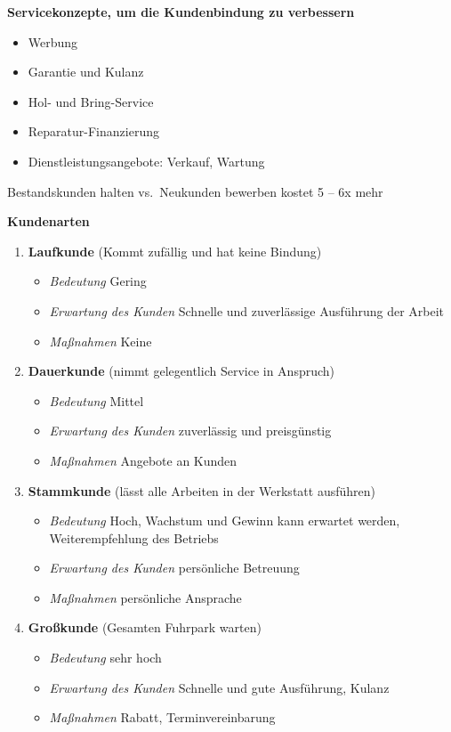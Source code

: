\textbf{Servicekonzepte, um die Kundenbindung zu verbessern}

\begin{itemize}
\item
  Werbung
\item
  Garantie und Kulanz
\item
  Hol- und Bring-Service
\item
  Reparatur-Finanzierung
\item
  Dienstleistungsangebote: Verkauf, Wartung
\end{itemize}

Bestandskunden halten vs.~Neukunden bewerben kostet 5 -- 6x mehr

\newpage

\textbf{Kundenarten}

\begin{enumerate}
\item
  \textbf{Laufkunde} (Kommt zufällig und hat keine Bindung)

  \begin{itemize}
  \item
    \emph{Bedeutung} Gering
  \item
    \emph{Erwartung des Kunden} Schnelle und zuverlässige Ausführung der
    Arbeit
  \item
    \emph{Maßnahmen} Keine
  \end{itemize}
\item
  \textbf{Dauerkunde} (nimmt gelegentlich Service in Anspruch)

  \begin{itemize}
  \item
    \emph{Bedeutung} Mittel
  \item
    \emph{Erwartung des Kunden} zuverlässig und preisgünstig
  \item
    \emph{Maßnahmen} Angebote an Kunden
  \end{itemize}
\item
  \textbf{Stammkunde} (lässt alle Arbeiten in der Werkstatt ausführen)

  \begin{itemize}
  \item
    \emph{Bedeutung} Hoch, Wachstum und Gewinn kann erwartet werden,
    Weiterempfehlung des Betriebs
  \item
    \emph{Erwartung des Kunden} persönliche Betreuung
  \item
    \emph{Maßnahmen} persönliche Ansprache
  \end{itemize}
\item
  \textbf{Großkunde} (Gesamten Fuhrpark warten)

  \begin{itemize}
  \item
    \emph{Bedeutung} sehr hoch
  \item
    \emph{Erwartung des Kunden} Schnelle und gute Ausführung, Kulanz
  \item
    \emph{Maßnahmen} Rabatt, Terminvereinbarung
  \end{itemize}
\end{enumerate}

